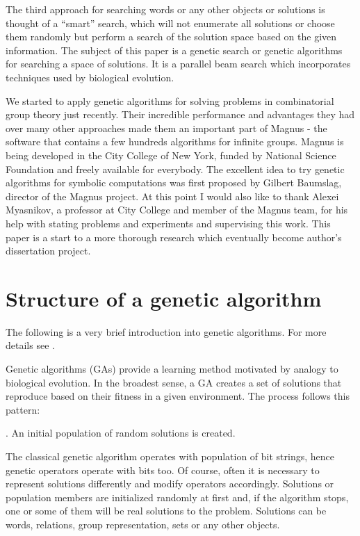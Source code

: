 \documentclass{article}
\begin{document}
The third approach for searching words or any other objects or
solutions is thought of a ``smart'' search, which will not enumerate
all solutions or choose them randomly but perform a search of the
solution space based on the given information. The subject of this
paper is a genetic search or genetic algorithms for searching a space
of solutions. It is a parallel beam search which incorporates
techniques used by biological evolution. 

We started to apply genetic algorithms for solving problems in
combinatorial group theory just recently. Their incredible performance
and advantages they had over many other approaches made them an
important part of Magnus \cite{Magnus} - the software that contains a
few hundreds algorithms for infinite groups. Magnus is being developed
in the City College of New York, funded by National Science Foundation
and freely available for everybody. The excellent idea to try genetic
algorithms for symbolic computations was first proposed by Gilbert
Baumslag, director of the Magnus project. At this point I would also
like to thank Alexei Myasnikov, a professor at City College and member
of the Magnus team, for his help with stating problems and experiments
and supervising this work. This paper is a start to a more thorough
research which eventually become author's dissertation project.


\section{Structure of a genetic algorithm}

The following is a very brief introduction into genetic
algorithms. For more details see \cite{GA1,GA2}. 

Genetic algorithms (GAs) provide a learning method motivated by
analogy to biological evolution. In the broadest sense, a GA creates a
set of solutions that reproduce based on their fitness in a given
environment. The process follows this pattern:

\vspace{3mm}
. An initial population of random solutions is created.
\vspace{3mm}

The classical genetic algorithm operates with population of bit
strings, hence genetic operators operate with bits too. Of course,
often it is necessary to represent solutions differently and modify
operators accordingly. Solutions or population members are initialized
randomly at first and, if the algorithm stops, one or some of them
will be real solutions to the problem. Solutions can be words,
relations, group representation, sets or any other objects.
\end{document}
